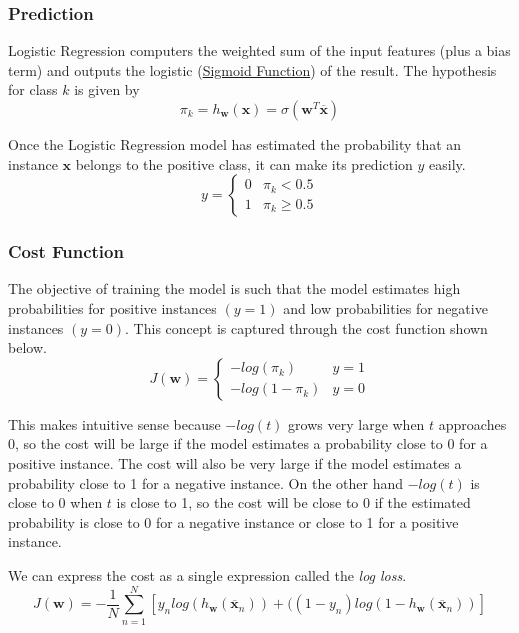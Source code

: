 \documentclass[12pt]{article}
\begin{document}
        \subsubsection{Prediction}
            Logistic Regression computers the weighted sum of the input features (plus a bias term) and outputs the
            logistic (\hyperlink{sigmoid function}{Sigmoid Function}) of the result. The hypothesis for class $k$ is
            given by
            $$ \pi_k = h_{\boldsymbol{w}}(\boldsymbol{x}) = \sigma(\boldsymbol{w}^T\overline{\boldsymbol{x}}) $$
            
            Once the Logistic Regression model has estimated the probability that an instance $\boldsymbol{x}$ belongs
            to the positive class, it can make its prediction $y$ easily.
            \[ y = 
                \begin{cases} 
                    0 & \pi_k < 0.5 \\
                    1 & \pi_k \geq 0.5 
                \end{cases}
            \]
        
        \subsubsection{Cost Function}
            The objective of training the model is such that the model estimates high probabilities for positive
            instances $(y = 1)$ and low probabilities for negative instances $(y = 0)$. This concept is captured through
            the cost function shown below.
            \[ J(\boldsymbol{w}) = 
                \begin{cases}
                    -log(\pi_k) & y = 1 \\
                    -log(1-\pi_k) & y = 0
                \end{cases}
            \]
            
            This makes intuitive sense because $-log(t)$ grows very large when $t$ approaches 0, so the cost will be
            large if the model estimates a probability close to 0 for a positive instance. The cost will also be very
            large if the model estimates a probability close to 1 for a negative instance. On the other hand $-log(t)$
            is close to 0 when $t$ is close to 1, so the cost will be close to 0 if the estimated probability is close
            to 0 for a negative instance or close to 1 for a positive instance.

            We can express the cost as a single expression called the \textit{log loss}. 
            $$J(\boldsymbol{w}) = -\frac{1}{N}\sum_{n=1}^N[y_n log(h_{\boldsymbol{w}}(\overline{\boldsymbol{x}}_n)) +
            ((1-y_n)log(1-h_{\boldsymbol{w}}(\overline{\boldsymbol{x}}_n))] $$
\end{document}
